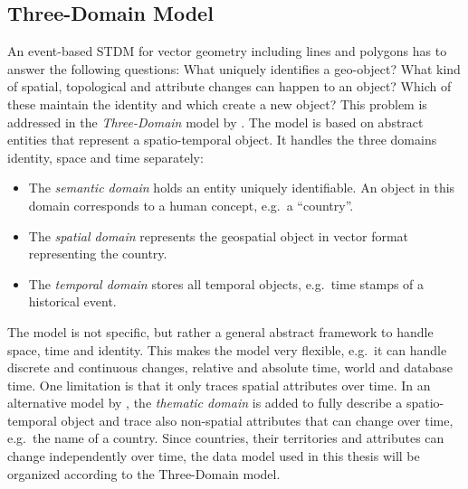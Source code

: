

\subsection{Three-Domain Model} %
\label{sub:three_domain_model}

An event-based STDM for vector geometry including lines and polygons has to answer the following questions: What uniquely identifies a geo-object? What kind of spatial, topological and attribute changes can happen to an object? Which of these maintain the identity and which create a new object? This problem is addressed in the \emph{Three-Domain} model by \cite{yuan96threedomain, yuan96temporal}. The model is based on abstract entities that represent a spatio-temporal object. It handles the three domains identity, space and time separately:
\begin{itemize}
  \item The \emph{semantic domain} holds an entity uniquely identifiable. An object in this domain corresponds to a human concept, e.g.\ a ``country''.
  \item The \emph{spatial domain} represents the geospatial object in vector format representing the country.
  \item The \emph{temporal domain} stores all temporal objects, e.g.\ time stamps of a historical event.
\end{itemize}

The model is not specific, but rather a general abstract framework to handle space, time and identity. This makes the model very flexible, e.g.\ it can handle discrete and continuous changes, relative and absolute time, world and database time. One limitation is that it only traces spatial attributes over time. In an alternative model by \cite{claramunt95timeingis}, the \emph{thematic domain} is added to fully describe a spatio-temporal object and trace also non-spatial attributes that can change over time, e.g.\ the name of a country. Since countries, their territories and attributes can change independently over time, the data model used in this thesis will be organized according to the Three-Domain model.

